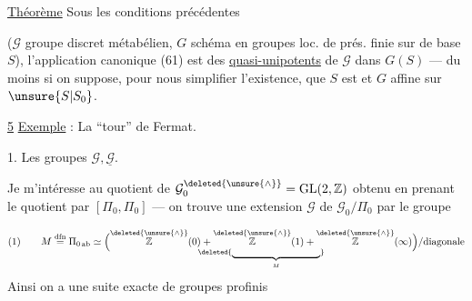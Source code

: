 \uline{Théorème}  Sous les conditions précédentes

($\mathcal{G}$ groupe discret métabélien, $G$ schéma en groupes loc. de prés. finie sur  de base $S$), l'application canonique (61) est    des  \uline{quasi-unipotents} de $\mathcal{G}$ dans $G(S)$ --- du moins si on suppose, pour nous simplifier l'existence, que $S$ est  et $G$ affine sur $\unsure{S|S_0}$.



\uline{5} \uline{Exemple} : La ``tour'' de Fermat.

1. Les groupes $\mathcal{G},\underline{\mathcal{G}}$.

Je m'intéresse au quotient de $\mathcal{G}_0^{\deleted{\unsure{\wedge}}}=\operatorname{GL}(2,\mathbb{Z})$ obtenu en prenant le quotient par $[\Pi_0,\Pi_0]$ --- on trouve une extension $\mathcal{G}$ de $\mathcal{G}_0/\Pi_0$ par le groupe


\[
\begin{aligned}
(1)\qquad M\overset{\mathrm{dfn}}{=}\Pi_{0\,\mathrm{ab}}
\simeq
\Bigl(
\underset{\deleted{\underbrace{\hphantom{\mathbb{Z}(0)+\mathbb{Z}(1)+\mathbb{Z}(\infty)}}_{M}}}
{\overset{\deleted{\unsure{\wedge}}}{\mathbb{Z}}(0)+
 \overset{\deleted{\unsure{\wedge}}}{\mathbb{Z}}(1)+
 \overset{\deleted{\unsure{\wedge}}}{\mathbb{Z}}(\infty)}
\Bigr)/\text{diagonale}
\end{aligned}
\]
Ainsi on a une suite exacte de groupes profinis

